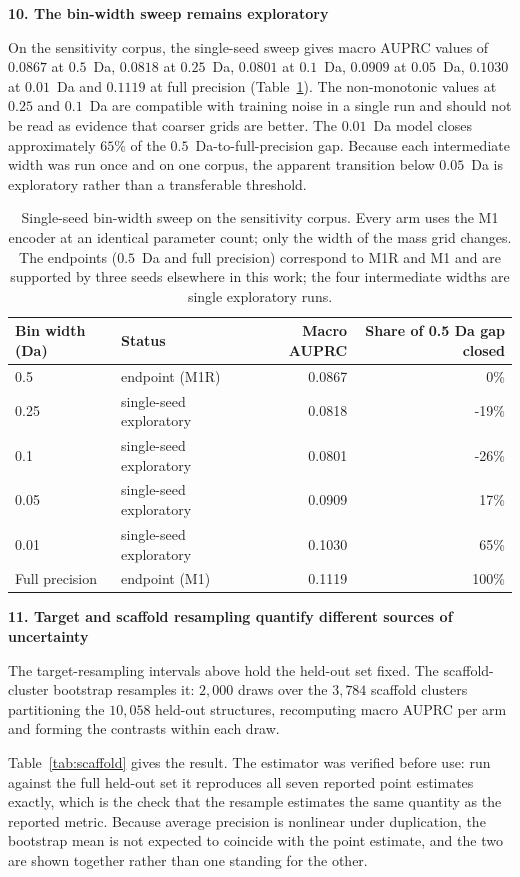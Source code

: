 \documentclass[11pt]{article}
\newcommand{\hd}[1]{\medskip\par\noindent\textbf{#1}\par\nobreak\vspace{2pt}\noindent\ignorespaces}
\begin{document}
\hd{10. The bin-width sweep remains exploratory}
On the sensitivity corpus, the single-seed sweep gives macro AUPRC values of $0.0867$ at $0.5$~Da, $0.0818$ at $0.25$~Da, $0.0801$ at $0.1$~Da, $0.0909$ at $0.05$~Da, $0.1030$ at $0.01$~Da and $0.1119$ at full precision (Table~\ref{tab:sweep}). The non-monotonic values at $0.25$ and $0.1$~Da are compatible with training noise in a single run and should not be read as evidence that coarser grids are better. The $0.01$~Da model closes approximately $65\%$ of the $0.5$~Da-to-full-precision gap. Because each intermediate width was run once and on one corpus, the apparent transition below $0.05$~Da is exploratory rather than a transferable threshold.

\begin{table}[ht]
\centering
\caption{Single-seed bin-width sweep on the sensitivity corpus. Every arm uses the M1 encoder at an identical parameter count; only the width of the mass grid changes. The endpoints ($0.5$~Da and full precision) correspond to M1R and M1 and are supported by three seeds elsewhere in this work; the four intermediate widths are single exploratory runs.}
\label{tab:sweep}
\small
\begin{tabular}{llrr}
\toprule
Bin width (Da) & Status & Macro AUPRC & Share of 0.5 Da gap closed\\
\midrule
0.5 & endpoint (M1R) & 0.0867 & 0\%\\
0.25 & single-seed exploratory & 0.0818 & -19\%\\
0.1 & single-seed exploratory & 0.0801 & -26\%\\
0.05 & single-seed exploratory & 0.0909 & 17\%\\
0.01 & single-seed exploratory & 0.1030 & 65\%\\
Full precision & endpoint (M1) & 0.1119 & 100\%\\
\bottomrule
\end{tabular}
\end{table}

\hd{11. Target and scaffold resampling quantify different sources of uncertainty}
The target-resampling intervals above hold the held-out set fixed. The scaffold-cluster bootstrap resamples it: $2{,}000$ draws over the $3{,}784$ scaffold clusters partitioning the $10{,}058$ held-out structures, recomputing macro AUPRC per arm and forming the contrasts within each draw.

Table~\ref{tab:scaffold} gives the result. The estimator was verified before use:
run against the full held-out set it reproduces all seven reported point estimates
exactly, which is the check that the resample estimates the same quantity as the
reported metric. Because average precision is nonlinear under duplication, the
bootstrap mean is not expected to coincide with the point estimate, and the two are
shown together rather than one standing for the other.
\end{document}
